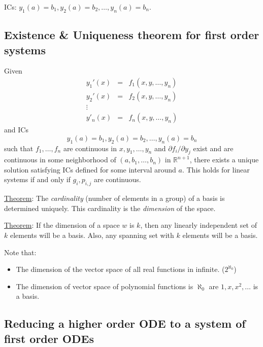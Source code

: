 \documentclass{article}
\newcommand{\tmem}[1]{{\em #1\/}}
\begin{document}
ICs: $y_1 (a) = b_1, y_2 (a) = b_2, \ldots, y_n (a) = b_n$.

\subsection{Existence \& Uniqueness theorem for first order systems}

Given
\begin{eqnarray*}
  y_1' (x) & = & f_1 (x, y, \ldots, y_n)\\
  y_2' (x) & = & f_2 (x, y, \ldots, y_n)\\
  \vdots &  & \\
  y'_n (x) & = & f_n (x, y, \ldots, y_n)
\end{eqnarray*}
and ICs
\[ y_1 (a) = b_1, y_2 (a) = b_2, \ldots, y_n (a) = b_n \]
such that $f_1, \ldots, f_n$ are continuous in $x, y_1, \ldots, y_n$ and
$\partial f_i / \partial y_j$ exist and are continuous in some neighborhood of
$(a, b_1, \ldots, b_n)$ in $\mathbb{R}^{n + 1}$, there exists a unique
solution satisfying ICs defined for some interval around $a$. This holds for
linear systems if and only if $g_i, p_{i, j}$ are continuous.


\begin{tmornamented}
  {\underline{Theorem}}: The {\tmem{cardinality}} (number of elements in a
  group) of a basis is determined uniquely. This cardinality is the
  {\tmem{dimension}} of the space.
  
  {\underline{Theorem}}: If the dimension of a space $w$ is $k$, then any
  linearly independent set of $k$ elements will be a basis. Also, any spanning
  set with $k$ elements will be a basis.
  
  Note that:
  \begin{itemize}
    \item The dimension of the vector space of all real functions in infinite.
    ($2^{\aleph_0}$)
    
    \item The dimension of vector space of polynomial functions is $\aleph_0$
    are $1, x, x^2, \ldots$ is a basis.
  \end{itemize}
\end{tmornamented}

\subsection{Reducing a higher order ODE to a system of first order ODEs}
\end{document}

